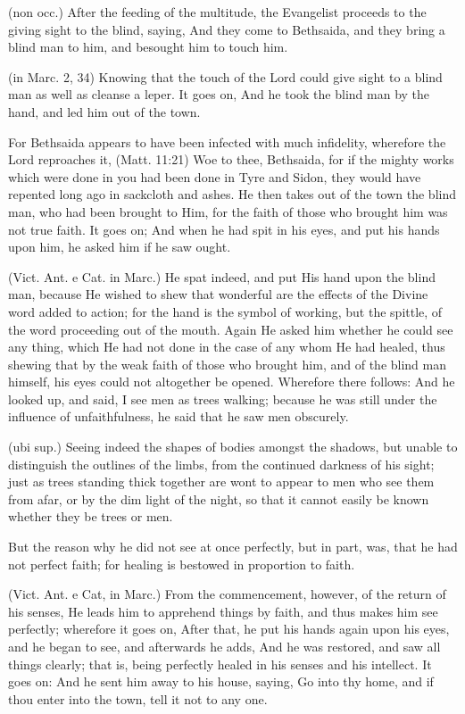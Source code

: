  (non occ.) After the feeding of the multitude, the Evangelist proceeds to the giving sight to the blind, saying, And they come to Bethsaida, and they bring a blind man to him, and besought him to touch him.

 (in Marc. 2, 34) Knowing that the touch of the Lord could give sight to a blind man as well as cleanse a leper. It goes on, And he took the blind man by the hand, and led him out of the town.

 For Bethsaida appears to have been infected with much infidelity, wherefore the Lord reproaches it, (Matt. 11:21) Woe to thee, Bethsaida, for if the mighty works which were done in you had been done in Tyre and Sidon, they would have repented long ago in sackcloth and ashes. He then takes out of the town the blind man, who had been brought to Him, for the faith of those who brought him was not true faith. It goes on; And when he had spit in his eyes, and put his hands upon him, he asked him if he saw ought.

 (Vict. Ant. e Cat. in Marc.) He spat indeed, and put His hand upon the blind man, because He wished to shew that wonderful are the effects of the Divine word added to action; for the hand is the symbol of working, but the spittle, of the word proceeding out of the mouth. Again He asked him whether he could see any thing, which He had not done in the case of any whom He had healed, thus shewing that by the weak faith of those who brought him, and of the blind man himself, his eyes could not altogether be opened. Wherefore there follows: And he looked up, and said, I see men as trees walking; because he was still under the influence of unfaithfulness, he said that he saw men obscurely.

 (ubi sup.) Seeing indeed the shapes of bodies amongst the shadows, but unable to distinguish the outlines of the limbs, from the continued darkness of his sight; just as trees standing thick together are wont to appear to men who see them from afar, or by the dim light of the night, so that it cannot easily be known whether they be trees or men.

 But the reason why he did not see at once perfectly, but in part, was, that he had not perfect faith; for healing is bestowed in proportion to faith.

 (Vict. Ant. e Cat, in Marc.) From the commencement, however, of the return of his senses, He leads him to apprehend things by faith, and thus makes him see perfectly; wherefore it goes on, After that, he put his hands again upon his eyes, and he began to see, and afterwards he adds, And he was restored, and saw all things clearly; that is, being perfectly healed in his senses and his intellect. It goes on: And he sent him away to his house, saying, Go into thy home, and if thou enter into the town, tell it not to any one.

